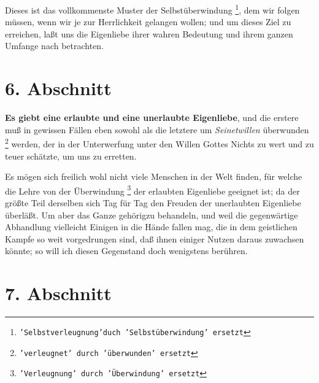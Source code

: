 Dieses ist das vollkommenste Muster der Selbstüberwindung
\footnote{\texttt{'Selbstverleugnung'duch 'Selbstüberwindung' ersetzt}}, dem wir
folgen
müssen, wenn wir je zur Herrlichkeit gelangen wollen; und um dieses Ziel zu
erreichen, laßt uns die Eigenliebe ihrer wahren Bedeutung und ihrem ganzen
Umfange nach betrachten.

\section{6. Abschnitt} \label{kap4_ab6}

\textbf{Es giebt eine erlaubte und eine unerlaubte Eigenliebe}, und die erstere
muß in
gewissen Fällen eben sowohl als die letztere um \textit{Seinetwillen} überwunden
\footnote{\texttt{'verleugnet' durch 'überwunden' ersetzt}}
werden, der in der Unterwerfung unter den Willen Gottes Nichts zu wert und zu
teuer schätzte, um uns zu erretten.

Es mögen sich freilich wohl nicht viele Menschen in der Welt finden, für welche
die Lehre von der Überwindung \footnote{\texttt{'Verleugnung' durch 'Überwindung' ersetzt}} der erlaubten Eigenliebe geeignet ist; da der
größte Teil derselben sich Tag für Tag den Freuden der unerlaubten
Eigenliebe überläßt. Um aber das Ganze gehörigzu behandeln, und weil die
gegenwärtige Abhandlung vielleicht Einigen in die Hände fallen mag, die in dem
geistlichen Kampfe so weit vorgedrungen sind, daß ihnen einiger Nutzen daraus
zuwachsen könnte; so will ich diesen Gegenstand doch wenigstens berühren.

\section{7. Abschnitt} \label{kap4_ab7}

